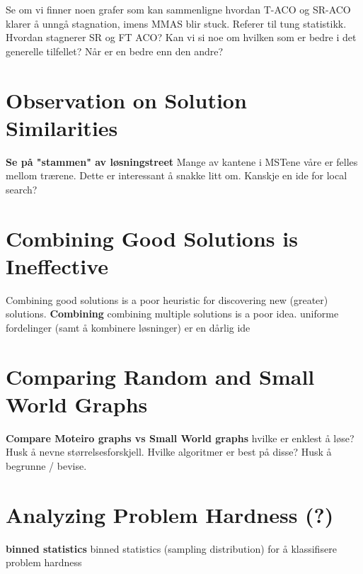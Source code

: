 Se om vi finner noen grafer som kan sammenligne hvordan T-ACO og SR-ACO klarer å unngå stagnation, imens MMAS blir stuck. Referer til tung statistikk. Hvordan stagnerer SR og FT ACO? Kan vi si noe om hvilken som er bedre i det generelle tilfellet? Når er en bedre enn den andre?




%


\section{Observation on Solution Similarities}
\textbf{Se på "stammen" av løsningstreet} Mange av kantene i MSTene våre er felles mellom trærene. Dette er interessant å snakke litt om. Kanskje en ide for local search?

%


\section{Combining Good Solutions is Ineffective}
Combining good solutions is a poor heuristic for discovering new (greater) solutions.
\textbf{Combining} combining multiple solutions is a poor idea. uniforme fordelinger (samt å kombinere løsninger) er en dårlig ide

%


\section{Comparing Random and Small World Graphs}
\textbf{Compare Moteiro graphs vs Small World graphs} hvilke er enklest å løse? Husk å nevne størrelsesforskjell. Hvilke algoritmer er best på disse? Husk å begrunne / bevise.

%


\section{Analyzing Problem Hardness (?)}
\textbf{binned statistics} binned statistics (sampling distribution) for å klassifisere problem hardness

%
